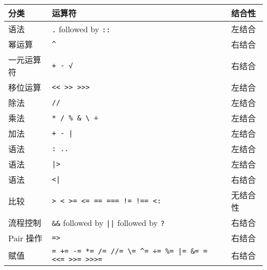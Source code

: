 \begin{table}[h]

\begin{tabulary}{\linewidth}{|L|L|L|}
\hline
分类 & 运算符 & 结合性 \\
\hline
语法 & \texttt{.} followed by \texttt{::} & 左结合 \\
\hline
幂运算 & \texttt{{\textasciicircum}} & 右结合 \\
\hline
一元运算符 & \texttt{+ - √} & 右结合\footnotemark[1] \\
\hline
移位运算 & \texttt{<< >> >>>} & 左结合 \\
\hline
除法 & \texttt{//} & 左结合 \\
\hline
乘法 & \texttt{* / \% \& {\textbackslash} ÷} & 左结合\footnotemark[2] \\
\hline
加法 & \texttt{+ - | \unicodeveebar{}} & 左结合\footnotemark[2] \\
\hline
语法 & \texttt{: ..} & 左结合 \\
\hline
语法 & \texttt{|>} & 左结合 \\
\hline
语法 & \texttt{<|} & 右结合 \\
\hline
比较 & \texttt{> < >= <= == === != !== <:} & 无结合性 \\
\hline
流程控制 & \texttt{\&\&} followed by \texttt{||} followed by \texttt{?} & 右结合 \\
\hline
Pair 操作 & \texttt{=>} & 右结合 \\
\hline
赋值 & \texttt{= += -= *= /= //= {\textbackslash}= {\textasciicircum}= ÷= \%= |= \&= \unicodeveebar{}= <<= >>= >>>=} & 右结合 \\
\hline
\end{tabulary}

\end{table}







